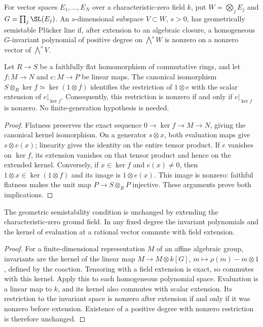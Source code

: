 \begin{definition}
\label{def:geometric-semistability}
\notready
For vector spaces $E_1,\ldots,E_N$ over a characteristic-zero field $k$,
put $W=\bigotimes_j E_j$ and $G=\prod_j\SL(E_j)$. An $s$-dimensional
subspace $V\subset W$, $s>0$, has geometrically semistable Pl\"ucker
line if, after extension to an algebraic closure, a homogeneous
$G$-invariant polynomial of positive degree on $\bigwedge^sW$ is
nonzero on a nonzero vector of $\bigwedge^sV$.
\end{definition}

\begin{lemma}
\label{lem:kernel-evaluation-base-change}
\leanok
Let $R\to S$ be a faithfully flat homomorphism of commutative rings,
and let $f:M\to N$ and $e:M\to P$ be linear maps. The canonical
isomorphism $S\otimes_R\ker f\simeq\ker(1\otimes f)$ identifies the
restriction of $1\otimes e$ with the scalar extension of $e|_{\ker f}$.
Consequently, this restriction is nonzero if and only if
$e|_{\ker f}$ is nonzero. No finite-generation hypothesis is needed.
\end{lemma}
\begin{proof}
Flatness preserves the exact sequence $0\to\ker f\to M\to N$,
giving the canonical kernel isomorphism. On a generator $s\otimes x$,
both evaluation maps give $s\otimes e(x)$; linearity gives the identity
on the entire tensor product. If $e$ vanishes on $\ker f$, its extension
vanishes on that tensor product and hence on the extended kernel.
Conversely, if $x\in\ker f$ and $e(x)\ne0$, then
$1\otimes x\in\ker(1\otimes f)$ and its image is $1\otimes e(x)$.
This image is nonzero: faithful flatness makes the unit map
$P\to S\otimes_R P$ injective. These arguments prove both implications.
\end{proof}

\begin{lemma}
\label{lem:invariant-base-change}
\notready
The geometric semistability condition is unchanged by extending the
characteristic-zero ground field. In any fixed degree the invariant
polynomials and the kernel of evaluation at a rational vector commute
with field extension.
\end{lemma}
\begin{proof}
For a finite-dimensional representation $M$ of an affine algebraic
group, invariants are the kernel of the linear map
$M\to M\otimes k[G]$, $m\mapsto\rho(m)-m\otimes1$, defined by the
coaction. Tensoring with a field extension is exact, so commutes with
this kernel. Apply this to each homogeneous polynomial space. Evaluation
is a linear map to $k$, and its kernel also commutes with scalar
extension. Its restriction to the invariant space is nonzero after
extension if and only if it was nonzero before extension. Existence of
a positive degree with nonzero restriction is therefore unchanged.
\end{proof}

